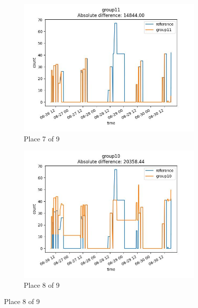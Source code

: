 \begin{figure}
    \begin{subfigure}[b]{0.45\textwidth}
        \includegraphics[width=\linewidth]{figures/ref-group11.jpeg}
        \caption{Place 7 of 9}
    \end{subfigure}
    \begin{subfigure}[b]{0.45\textwidth}
        \includegraphics[width=\linewidth]{figures/ref-group10.jpeg}
        \caption{Place 8 of 9}
    \end{subfigure}


\end{figure}
